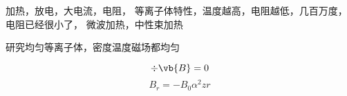加热，放电，大电流，电阻，
等离子体特性，温度越高，电阻越低，几百万度，电阻已经很小了，
微波加热，中性束加热


研究均匀等离子体，密度温度磁场都均匀 

\begin{equation*}
  \div \vb{B} = 0
\end{equation*}
\begin{equation}
  B_r = -B_0 \alpha^2 z r
\end{equation}

% 




